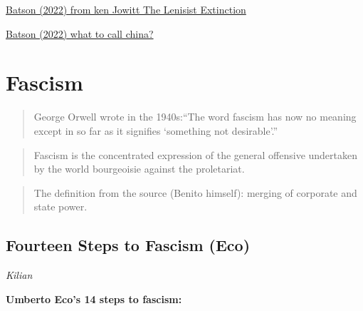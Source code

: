 \documentclass[
]{book}
\begin{document}
\href{https://andrewbatson.com/2022/09/26/what-was-the-cold-war-and-is-it-over/}{Batson (2022) from ken Jowitt The Lenisist Extinction}

\href{https://andrewbatson.com/2022/02/08/socialist-capitalist-leninist-what-to-call-china/}{Batson (2022) what to call china?}

\hypertarget{fascism}{%
\chapter{Fascism}\label{fascism}}

\begin{quote}
George Orwell wrote in the 1940s:``The word fascism has now no meaning except in so far as it signifies `something not desirable'.''
\end{quote}

\begin{quote}
Fascism is the concentrated expression of the general offensive undertaken by the world bourgeoisie against the proletariat.
\end{quote}

\begin{quote}
The definition from the source (Benito himself): merging of corporate and state power.
\end{quote}

\hypertarget{fourteen-steps-to-fascism-eco}{%
\section{Fourteen Steps to Fascism (Eco)}\label{fourteen-steps-to-fascism-eco}}

\emph{Kilian}

\textbf{Umberto Eco's 14 steps to fascism:}
\end{document}

